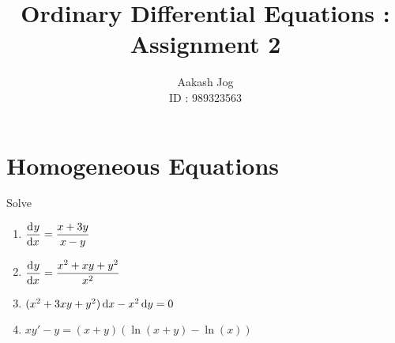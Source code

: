 \documentclass[fleqn, a4paper, 12pt, oneside]{amsart}
\title{Ordinary Differential Equations : Assignment 2}
\author
{
	Aakash Jog\\
	ID : 989323563
}
\date{\formatdate{16}{4}{2015}}
\theoremstyle{definition}
\theoremstyle{theorem}
\begin{document}
	
\maketitle

\part{Homogeneous Equations}

\begin{question}
	Solve
	\begin{enumerate}[leftmargin=*]
		\item $\dod{y}{x} = \dfrac{x + 3y}{x - y}$
		\item $\dod{y}{x} = \dfrac{x^2 + xy + y^2}{x^2}$
		\item $(x^2 + 3xy + y^2) \dif x - x^2 \dif y = 0$
		\item $x y' - y = (x + y)\left( \ln (x + y)  - \ln (x) \right)$
	\end{enumerate}
\end{question}
\end{document}
